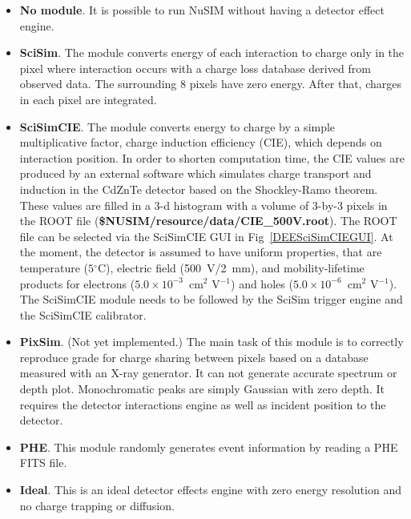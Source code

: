 \begin{itemize}
 \item \textbf{No module}.
       It is possible to run NuSIM without having a detector effect engine.
 \item \textbf{SciSim}.
       The module converts energy of each interaction to charge only
       in the pixel where interaction occurs with a charge loss database
       derived from observed data.
       The surrounding 8 pixels have zero energy.
       After that, charges in each pixel are integrated.
 \item \textbf{SciSimCIE}.
       The module converts energy to charge
       by a simple multiplicative factor, charge induction efficiency
       (CIE), which depends on interaction position.
       In order to shorten computation time, the CIE values are produced
       by an external software which simulates charge transport and
       induction in the CdZnTe detector based on the Shockley-Ramo theorem.
       These values are filled in a 3-d histogram with a volume of 3-by-3
       pixels in the ROOT file
       (\textbf{\${NUSIM}/resource/data/CIE\_500V.root}).
       The ROOT file can be selected via the SciSimCIE GUI in
       Fig~\ref{DEESciSimCIEGUI}.
       At the moment, the detector is assumed to have uniform properties,
       that are temperature ($5{}^\circ\mathrm{C}$),
       electric field (500~V/2~mm), and mobility-lifetime products for
       electrons ($5.0 \times 10^{-3}$~cm$^{2}$ V$^{-1}$)
       and holes ($5.0 \times 10^{-6}$~cm$^{2}$ V$^{-1}$).
       The SciSimCIE module needs to be followed by the SciSim trigger
       engine and the SciSimCIE calibrator.
 \item \textbf{PixSim}.
       (Not yet implemented.)
       The main task of this module is to correctly reproduce grade for
       charge sharing between pixels based on a database measured with
       an X-ray generator. It can not generate accurate spectrum or depth
       plot. Monochromatic peaks are simply Gaussian with zero depth.
       It requires the detector interactions engine as well as incident
       position to the detector.
 \item \textbf{PHE}.
       This module randomly generates event information by reading
       a PHE FITS file.
 \item \textbf{Ideal}.
       This is an ideal detector effects engine with zero energy
       resolution and no charge trapping or diffusion.
\end{itemize}

